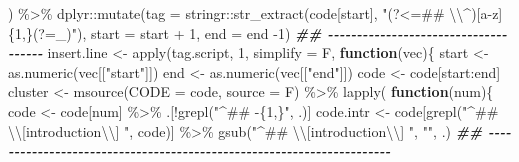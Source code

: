 \documentclass[
]{article}
\newenvironment{Shaded}{\begin{snugshade}}{\end{snugshade}}
\newcommand{\AttributeTok}[1]{\textcolor[rgb]{0.77,0.63,0.00}{#1}}
\newcommand{\ControlFlowTok}[1]{\textcolor[rgb]{0.13,0.29,0.53}{\textbf{#1}}}
\newcommand{\DecValTok}[1]{\textcolor[rgb]{0.00,0.00,0.81}{#1}}
\newcommand{\DocumentationTok}[1]{\textcolor[rgb]{0.56,0.35,0.01}{\textbf{\textit{#1}}}}
\newcommand{\FunctionTok}[1]{\textcolor[rgb]{0.00,0.00,0.00}{#1}}
\newcommand{\NormalTok}[1]{#1}
\newcommand{\OtherTok}[1]{\textcolor[rgb]{0.56,0.35,0.01}{#1}}
\newcommand{\SpecialCharTok}[1]{\textcolor[rgb]{0.00,0.00,0.00}{#1}}
\newcommand{\StringTok}[1]{\textcolor[rgb]{0.31,0.60,0.02}{#1}}
\begin{document}
\begin{Shaded}
\begin{Highlighting}[]
\NormalTok{    ) }\SpecialCharTok{\%\textgreater{}\%} 
\NormalTok{      dplyr}\SpecialCharTok{::}\FunctionTok{mutate}\NormalTok{(}\AttributeTok{tag =}\NormalTok{ stringr}\SpecialCharTok{::}\FunctionTok{str\_extract}\NormalTok{(code[start], }\StringTok{"(?\textless{}=\#\# }\SpecialCharTok{\textbackslash{}\textbackslash{}}\StringTok{\^{})[a{-}z]\{1,\}(?=\_)"}\NormalTok{),}
                    \AttributeTok{start =}\NormalTok{ start }\SpecialCharTok{+} \DecValTok{1}\NormalTok{,}
                    \AttributeTok{end =}\NormalTok{ end }\SpecialCharTok{{-}}\DecValTok{1}\NormalTok{)}
    \DocumentationTok{\#\# {-}{-}{-}{-}{-}{-}{-}{-}{-}{-}{-}{-}{-}{-}{-}{-}{-}{-}{-}{-}{-}{-}{-}{-}{-}{-}{-}{-}{-}{-}{-}{-}{-}{-}{-}{-}{-} }
\NormalTok{    insert.line }\OtherTok{\textless{}{-}}
        \FunctionTok{apply}\NormalTok{(tag.script, }\DecValTok{1}\NormalTok{, }\AttributeTok{simplify =}\NormalTok{ F,}
               \ControlFlowTok{function}\NormalTok{(vec)\{}
\NormalTok{                 start }\OtherTok{\textless{}{-}} \FunctionTok{as.numeric}\NormalTok{(vec[[}\StringTok{"start"}\NormalTok{]])}
\NormalTok{                 end }\OtherTok{\textless{}{-}} \FunctionTok{as.numeric}\NormalTok{(vec[[}\StringTok{"end"}\NormalTok{]])}
\NormalTok{                 code }\OtherTok{\textless{}{-}}\NormalTok{ code[start}\SpecialCharTok{:}\NormalTok{end]}
\NormalTok{                 cluster }\OtherTok{\textless{}{-}} \FunctionTok{msource}\NormalTok{(}\AttributeTok{CODE =}\NormalTok{ code, }\AttributeTok{source =}\NormalTok{ F) }\SpecialCharTok{\%\textgreater{}\%} 
                   \FunctionTok{lapply}\NormalTok{(}
                          \ControlFlowTok{function}\NormalTok{(num)\{}
\NormalTok{                            code }\OtherTok{\textless{}{-}}\NormalTok{ code[num] }\SpecialCharTok{\%\textgreater{}\%} 
\NormalTok{                              .[}\SpecialCharTok{!}\FunctionTok{grepl}\NormalTok{(}\StringTok{"\^{}\#\# {-}\{1,\}"}\NormalTok{, .)]}
\NormalTok{                            code.intr }\OtherTok{\textless{}{-}}\NormalTok{ code[}\FunctionTok{grepl}\NormalTok{(}\StringTok{"\^{}\#\# }\SpecialCharTok{\textbackslash{}\textbackslash{}}\StringTok{[introduction}\SpecialCharTok{\textbackslash{}\textbackslash{}}\StringTok{] "}\NormalTok{, code)] }\SpecialCharTok{\%\textgreater{}\%} 
                              \FunctionTok{gsub}\NormalTok{(}\StringTok{"\^{}\#\# }\SpecialCharTok{\textbackslash{}\textbackslash{}}\StringTok{[introduction}\SpecialCharTok{\textbackslash{}\textbackslash{}}\StringTok{] "}\NormalTok{, }\StringTok{""}\NormalTok{, .)}
                            \DocumentationTok{\#\# {-}{-}{-}{-}{-}{-}{-}{-}{-}{-}{-}{-}{-}{-}{-}{-}{-}{-}{-}{-}{-}{-}{-}{-}{-}{-}{-}{-}{-}{-}{-}{-}{-}{-}{-}{-}{-}{-}{-}{-}{-}{-}{-}{-}{-}{-}{-}{-}{-}{-}{-}{-}{-}{-}{-}{-}{-}{-}{-}{-}{-}{-}{-}{-}{-}{-}{-}{-}{-}{-} }

\end{Highlighting}
\end{Shaded}
\end{document}
